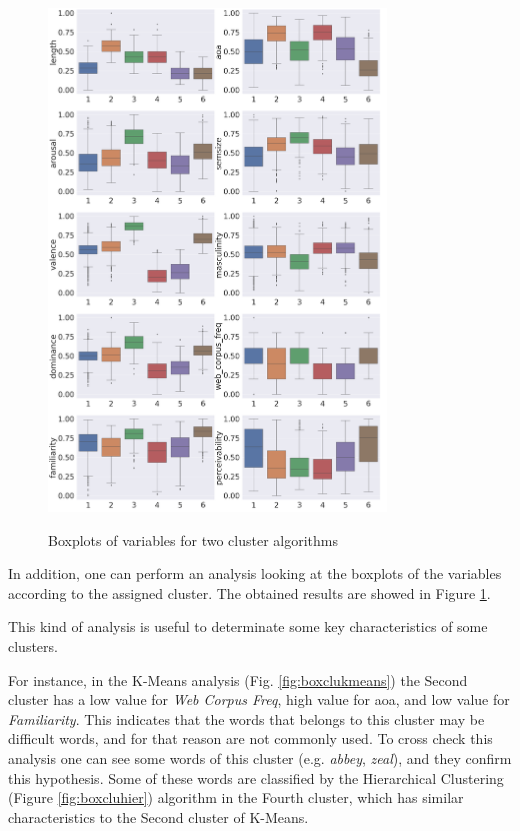 \documentclass[a4paper,11pt,dvipsnames]{article}
\begin{document}
\begin{figure}[h]
\begin{minipage}{0.47\linewidth}
            \includegraphics[width=0.8\textwidth]{hierarchical-box2.png}
            \label{fig:boxcluhier}
    \end{minipage}
        \caption{Boxplots of variables for two cluster algorithms}
    \label{fig:boxcluster}
\end{figure}


In addition, one can perform an analysis looking at the boxplots of the variables according to the assigned cluster. The obtained results are showed in Figure \ref{fig:boxcluster}.


This kind of analysis is useful to determinate some key characteristics of some clusters. 

For instance, in the K-Means analysis (Fig. \ref{fig:boxclukmeans}) the Second cluster has a low value for \textit{Web Corpus Freq}, high value for aoa, and low value for \textit{Familiarity}. This indicates that the words that belongs to this cluster may be difficult words, and for that reason are not commonly used. To cross check this analysis one can see some words of this cluster (e.g. \textit{abbey}, \textit{zeal}), and they confirm this hypothesis.
Some of these words are classified by the Hierarchical Clustering (Figure \ref{fig:boxcluhier}) algorithm in the Fourth cluster, which has similar characteristics to the Second cluster of K-Means.
\end{document}
